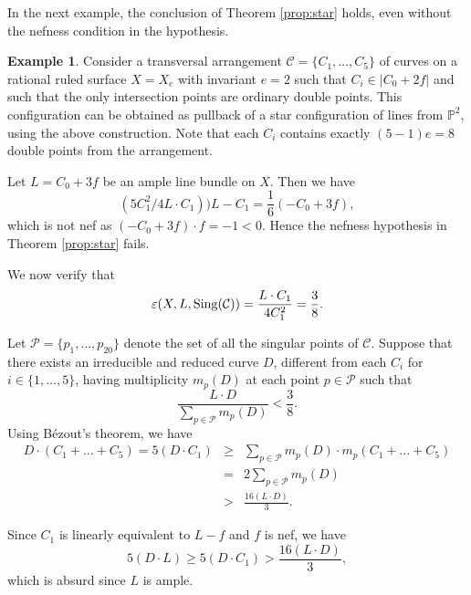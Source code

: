 \documentclass[12pt,reqno]{amsart}
\theoremstyle{plain}
\numberwithin{equation}{section}
\theoremstyle{definition}
\newtheorem{example}[theorem]{Example}
\begin{document}
	In the next example, the conclusion of Theorem \ref{prop:star} holds, even without the nefness condition in the hypothesis. 
	\begin{example}\label{nef}
		Consider a transversal arrangement $\mathcal{C} = \{C_{1}, \ldots, C_{5}\}$ of curves on a rational ruled surface $X=X_e$ with invariant $e=2$ such that $ C_i \in |C_0+2f|$ and such that the only intersection points are ordinary double points. This configuration can be obtained as pullback of a star configuration of lines from $\mathbb{P}^2$, using the above construction. Note that each $C_i$ contains exactly $(5-1)e=8$ double points from the arrangement.
		
 Let $L=C_0+3f$ be an ample line bundle on $X.$ Then we have $$(5C_1^2/4L\cdot C_1))L-C_1= \frac{1}{6}(-C_0+3f),$$ which is not nef as $(-C_0+3f)\cdot f = -1 < 0.$ Hence the nefness hypothesis in Theorem \ref{prop:star} fails. 
		
		We now verify that 
		$$\varepsilon(X, L,{\rm Sing}(\mathcal{C})) = \frac{L\cdot C_1}{4C_1^2}=\frac{3}{8}.$$
		
		Let $\mathcal{P} = \{p_{1}, \ldots, p_{20}\}$ denote the set of all the singular points of $\mathcal{C}$. Suppose that there exists an irreducible and reduced curve $D$, different from each $C_{i}$ for $i \in \{1,\ldots, 5\}$, having multiplicity $m_{p}(D)$ at each point $p \in \mathcal{P}$ such that
		\begin{equation}\label{eg ineq}
			\frac{L \cdot D}{\sum_{p \in \mathcal{P}} m_{p}(D)} < \frac{3}{8}.
		\end{equation}
		Using B\'ezout's theorem, we have
		\begin{eqnarray*}
		D\cdot (C_{1}+ \ldots + C_{5})=5(D\cdot C_1) &\geq& \sum_{p \in \mathcal{P}}m_{p}(D)\cdot m_{p}(C_1+\ldots+C_5)\\&=& 2\sum_{p \in \mathcal{P}} m_{p}(D)\\&>&\frac{16(L \cdot D)}{3}.\end{eqnarray*}
		
		Since $C_1$ is linearly equivalent to $L-f$ and $f$ is nef,  we have $$5(D \cdot L) \geq 5(D \cdot C_{1})> \frac{16(L \cdot D)}{3} ,$$ which is absurd since $L$ is ample.
		
	\end{example}
	
\end{document}
